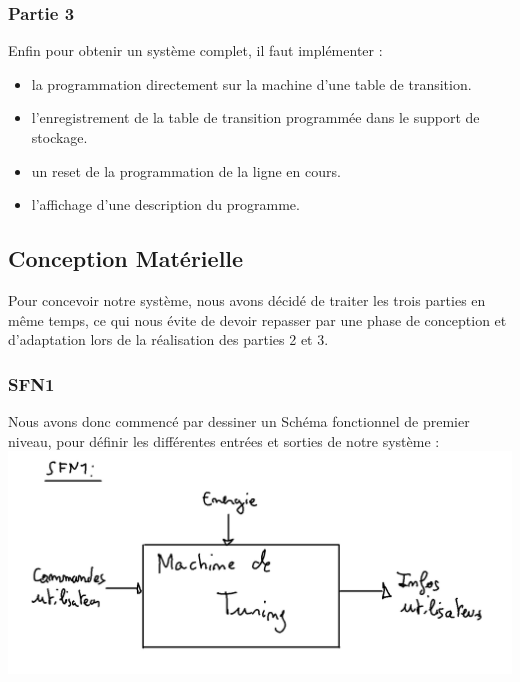 \documentclass[12pt]{article}
\begin{document}
	 \subsubsection{Partie 3}
	 Enfin pour obtenir un système complet, il faut implémenter :\\
	 \begin{itemize}[label=$-$]
	 	\item la programmation directement sur la machine d'une table de transition.\\
	 	\item l'enregistrement de la table de transition programmée dans le support de stockage.\\
	 	\item un reset de la programmation de la ligne en cours.\\
	 	\item l'affichage d'une description du programme.
	 	\end{itemize}
	 \subsection{Conception Matérielle}
	 Pour concevoir notre système, nous avons décidé de traiter les trois parties en même temps, ce qui nous évite de devoir repasser par une phase de conception et d'adaptation lors de la réalisation des parties 2 et 3.\\
	 \subsubsection{SFN1}
	 Nous avons donc commencé par dessiner un Schéma fonctionnel de premier niveau, pour définir les différentes entrées et sorties de notre système :\\
	 \includegraphics[width=\textwidth]{img/SFN1}
\end{document}
